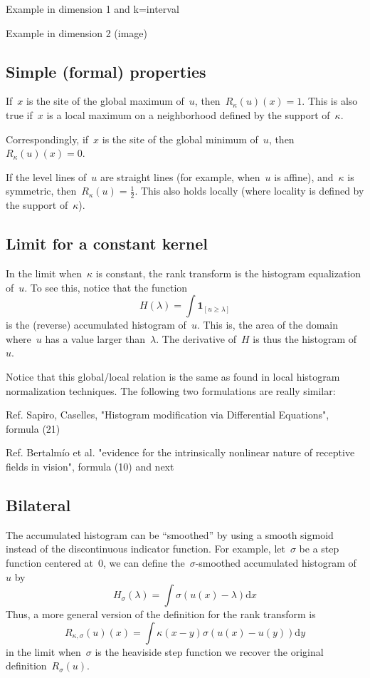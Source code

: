 \documentclass[12pt]{article}                  %
\begin{document}
Example in dimension 1 and k=interval

Example in dimension 2 (image)

\subsection{Simple (formal) properties}

If~$x$ is the site of the global maximum of~$u$, then~$R_\kappa(u)(x)=1$.
This is also true if~$x$ is a local maximum on a neighborhood defined by the
support of~$\kappa$.

Correspondingly, if~$x$ is the site of the global minimum of~$u$,
then~$R_\kappa(u)(x)=0$.

If the level lines of~$u$ are straight lines (for example, when~$u$ is
affine), and~$\kappa$ is symmetric, then~$R_\kappa(u)=\frac12$.  This also
holds locally (where locality is defined by the support of~$\kappa$).




\subsection{Limit for a constant kernel}

In the limit when~$\kappa$ is constant, the rank transform is the histogram
equalization of~$u$.  To see this, notice that the function
\[
H(\lambda) = \int\mathbf{1}_{[u\ge\lambda]}
\]
is the (reverse) accumulated histogram of~$u$.  This is, the area of the domain
where~$u$ has a value larger than~$\lambda$.  The derivative of~$H$ is thus the
histogram of~$u$.

Notice that this global/local relation is the same as found in local
histogram normalization techniques.
The following two formulations are really similar:

Ref. Sapiro, Caselles,  "Histogram modification via Differential Equations",
formula (21)

Ref. Bertalmío et al. "evidence for the intrinsically nonlinear nature of
receptive fields in vision", formula (10) and next



\subsection{Bilateral}
The accumulated histogram can be ``smoothed'' by using a smooth sigmoid instead
of the discontinuous indicator function.  For example, let~$\sigma$ be a step
function centered at~$0$, we can define the~$\sigma$-smoothed accumulated
histogram of~$u$ by
\[
H_\sigma(\lambda)=\int\sigma(u(x)-\lambda)\mathrm{d}x
\]
Thus, a more general version of the definition for the rank transform is
\begin{equation}\label{eq:generalrank}
R_{\kappa,\sigma}(u)(x)=\int \kappa(x-y)\sigma(u(x)-u(y))\mathrm{d}y
\end{equation}
in the limit when~$\sigma$ is the heaviside step function we recover the
original definition~$R_\sigma(u)$.
\end{document}
